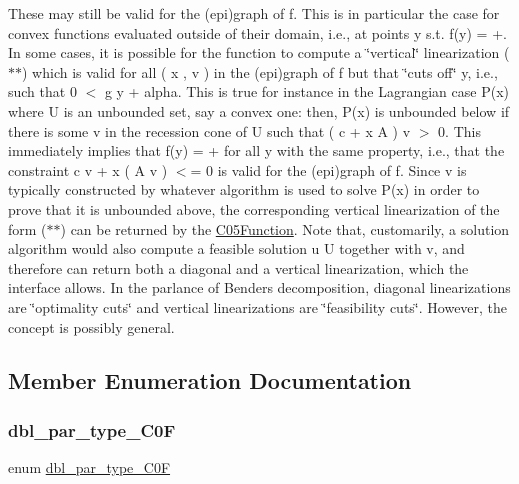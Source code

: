 These may still be valid for the (epi)graph of f. This is in particular the case for convex functions evaluated outside of their domain, i.\+e., at points y s.\+t. f(y) = +. In some cases, it is possible for the function to compute a \char`\"{}vertical\char`\"{} linearization ($\ast$$\ast$) which is valid for all ( x , v ) in the (epi)graph of f but that \char`\"{}cuts off\char`\"{} y, i.\+e., such that 0 $<$ g y + alpha. This is true for instance in the Lagrangian case P(x) where U is an unbounded set, say a convex one\+: then, P(x) is unbounded below if there is some v in the recession cone of U such that ( c + x A ) v $>$ 0. This immediately implies that f(y) = + for all y with the same property, i.\+e., that the constraint c v + x ( A v ) $<$= 0 is valid for the (epi)graph of f. Since v is typically constructed by whatever algorithm is used to solve P(x) in order to prove that it is unbounded above, the corresponding vertical linearization of the form ($\ast$$\ast$) can be returned by the \mbox{\hyperlink{class_s_m_spp__di__unipi__it_1_1_c05_function}{C05\+Function}}. Note that, customarily, a solution algorithm would also compute a feasible solution u  U together with v, and therefore can return both a diagonal and a vertical linearization, which the interface allows. In the parlance of Benders\textquotesingle{} decomposition, diagonal linearizations are \char`\"{}optimality cuts\char`\"{} and vertical linearizations are \char`\"{}feasibility cuts\char`\"{}. However, the concept is possibly general. 

\subsection{Member Enumeration Documentation}
\mbox{\label{class_s_m_spp__di__unipi__it_1_1_c05_function_ad345d4c374ce38e8a5fe153e07da4fa5}} 
\subsubsection{\texorpdfstring{dbl\+\_\+par\+\_\+type\+\_\+\+C0F}{dbl\_par\_type\_C0F}}
{\footnotesize\ttfamily enum \mbox{\hyperlink{class_s_m_spp__di__unipi__it_1_1_c05_function_ad345d4c374ce38e8a5fe153e07da4fa5}{dbl\+\_\+par\+\_\+type\+\_\+\+C0F}}}



